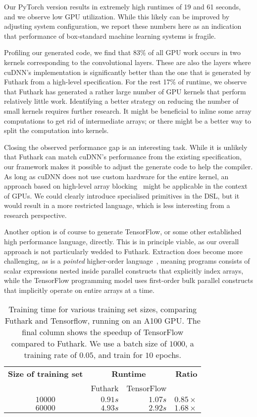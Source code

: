 Our PyTorch version results in extremely high runtimes of 19 and 61
seconds, and we observe low GPU utilization. While this likely can be
improved by adjusting system configuration, we report these numbers here
as an indication that performance of box-standard machine learning systems is
fragile.

Profiling our generated code, we find that 83\% of all GPU work occurs
in two kernels corresponding to the convolutional layers. These are also the layers
where cuDNN's implementation is significantly better than the one
that is generated by Futhark from a high-level specification.
For the rest 17\% of runtime, we observe that Futhark has
generated a rather large number of GPU kernels that perform relatively
little work.  Identifying a better strategy on reducing the number
of small kernels requires further research.  It might be beneficial to
inline some array computations to get rid of intermediate arrays;
or there might be a better way to split the computation into kernels.

Closing the observed performance gap is an interesting task.
While it is unlikely that Futhark can match cuDNN's performance
from the existing specification, our framework makes it possible
to adjust the generate code to help the compiler.  As long as cuDNN
does not use custom hardware for the entire kernel, an approach
based on high-level array blocking~\cite{rp-mm} might be applicable
in the context of GPUs.  We could clearly introduce specialised
primitives in the DSL, but it would result in a more
restricted language, which is less interesting from a research
perspective.

Another option is of course to generate TensorFlow, or some other established
high performance language, directly. This is in principle viable, as our overall
approach is not particularly wedded to Futhark. Extraction does become more
challenging, as  is a \emph{pointed} higher-order
language~\cite{10.1145/3473593}, meaning programs consists of scalar expressions
nested inside parallel constructs that explicitly index arrays, while the
TensorFlow programming model uses first-order bulk parallel constructs that
implicitly operate on entire arrays at a time.

\begin{table}
\begin{tabular}{crrr}
\textbf{Size of training set} & \multicolumn{2}{c}{\textbf{Runtime}} & \textbf{Ratio} \\
& Futhark & TensorFlow & \\
$10000$ & $0.91s$ & $1.07s$ &  $0.85\times{}$ \\
$60000$ & $4.93s$ & $2.92s$ &  $1.68\times{}$
\end{tabular}
\caption{Training time for various training set sizes, comparing
  Futhark and Tensorflow, running on an A100 GPU. The final column
  shows the speedup of TensorFlow compared to Futhark. We use a batch
  size of $1000$, a training rate of $0.05$, and train for $10$
  epochs.}
\label{tab:performance}
\end{table}

%
